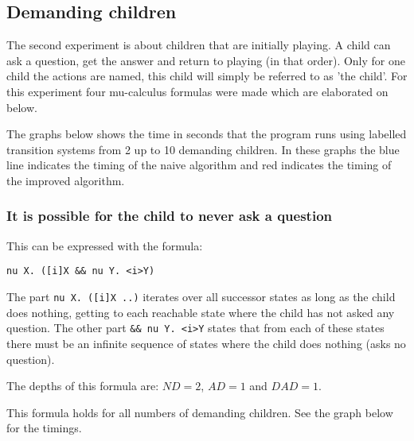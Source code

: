 \documentclass[10pt,a4paper]{article}
\begin{document}
\subsection{Demanding children}
The second experiment is about children that are initially playing. A child can ask a question, get the answer and return to playing (in that order). Only for one child the actions are named, this child will simply be referred to as 'the child'. For this experiment four mu-calculus formulas were made which are elaborated on below.

The graphs below shows the time in seconds that the program runs using labelled transition systems from 2 up to 10 demanding children. In these graphs the blue line indicates the timing of the naive algorithm and red indicates the timing of the improved algorithm.

\subsubsection{It is possible for the child to never ask a question}
This can be expressed with the formula:

\begin{center}
	{\tt nu X. ([i]X \&\& nu Y. <i>Y)}
\end{center}	
	
The part {\tt nu X. ([i]X ..)} iterates over all successor states as long as the child does nothing, getting to each reachable state where the child has not asked any question. The other part {\tt \&\& nu Y. <i>Y} states that from each of these states there must be an infinite sequence of states where the child does nothing (asks no question).

The depths of this formula are: $ND = 2$, $AD = 1$ and $DAD = 1$.

This formula holds for all numbers of demanding children. See the graph below for the timings.

\end{document}
